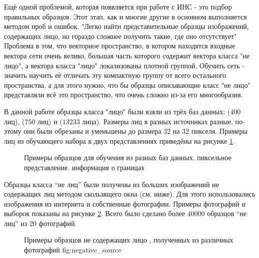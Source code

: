 \documentclass[12pt]{report}
\begin{document}
Ещё одной проблемой, которая появляется при работе с ИНС - это подбор правильных образцов. Этот этап, как и многие 
другие в основном выполняется методом проб и ошибок. "Легко найти представительные образцы изображений, содержащих 
лицо, но гораздо сложнее получить такие, где оно отсутствует" \citep{rowley1998neural} Проблема в том, что 
векторное 
пространство, в котором находятся входные вектора сети очень велико, большая часть которого содержит вектора класса 
"не лицо", а вектора класса "лицо" локализованы плотной группой. Обучить сеть - значить научить её отличать эту 
компактную группу от всего остального пространства, а для этого нужно, что бы образцы описывающие класс "не лицо" 
представляли всё это пространство, что очень сложно из-за его многообразия. %

В данной работе образцы класса "лицо" были взяли из трёх баз данных: \citep{samaria1994parameterisation} ($400$ 
лиц), 
\citep{GeorgiaTechFaceDatabase} ($750$ лиц) и \citep{huang2007labeled} ($13 233$ лица). Размеры лиц в разных 
источниках разные, по-этому они были  обрезаны и уменьшены до размера 32 на 32 пикселя. Примеры лиц из обучающего 
набора в двух представлениях приведёны на рисунке \ref{fig:sample_faces}.

\begin{figure}[h]
	\centering
	\caption{Примеры образцов для обучения из разных баз данных.  пиксельное представление. 
 информация о границах}
	\label{fig:sample_faces}
\end{figure}

Образцы класса ``не лиц'' были получены из больших изображений не содержащих лиц методом скользящего окна (см. 
ниже). 
Для этого использовались изображения из интернета и собственные фотографии. Примеры фотографий и выборок показаны 
на 
рисунке \ref{fig:sample_nonfaces}. Всего было сделано более $40 000$ образцов ``не лиц'' из 20 фотографий.

\begin{figure}[h]
	\centering
	\caption{Примеры образцов не содержащих лицо , полученных из различных фотографий \subref
{fig:negative_source}}
	\label{fig:sample_nonfaces}
\end{figure}
\end{document}
